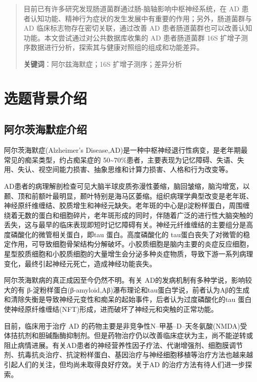 \documentclass[supercite]{HustGraduPaper}
\begin{document}
\clearpage%

\begin{abstract}
	目前已有许多研究发现肠道菌群通过肠-脑轴影响中枢神经系统，在 AD 患者认知功能、精神行为症状的发生发展中有重要的作用；另外，肠道菌群与 AD 临床标志物存在密切关联，通过改善 AD 患者肠道菌群也可以改善认知功能。本文尝试通过对公共数据库收集的 AD 患者肠道菌群 16S 扩增子测序数据进行分析，探索其与健康对照组的组成和功能差异。
	
	{\songti \bfseries 关键词}：阿尔兹海默症；16S 扩增子测序；差异分析
\end{abstract}
\section{选题背景介绍}


\subsection{阿尔茨海默症介绍}

阿尔茨海默症(Alzheimer's Disease,AD)是一种中枢神经退行性病变，是老年期最常见的痴呆类型，约占痴呆症的
50\textasciitilde70\%患者，主要表现为记忆障碍、失语、失用、失认、视空间能力损害、抽象思维和计算力损害、人格和行为改变等\cite{Burnsb158}。

AD患者的病理解剖检查可见大脑半球皮质弥漫性萎缩，脑回皱缩，脑沟增宽，以颞、顶和前额叶最明显，颞叶特别是海马区萎缩\cite{wenk2003neuropathologic}。组织病理学典型改变是老年斑、神经原纤维缠结、胶质增生和神经元缺失\cite{tiraboschi2004importance}。老年斑的中心是β淀粉样蛋白，周围缠绕着无数的蛋白和细胞碎片，老年斑形成的同时，伴随着广泛的进行性大脑突触的丢失，这与最早的临床表现即短时记忆障碍有关。神经元纤维缠结的主要组分是高度磷酸化的微管相关蛋白，即tau 蛋白。高度磷酸化的 tau蛋白丧失了对微管的稳定作用，可导致细胞骨架结构分解破坏。小胶质细胞是脑内主要的炎症反应细胞，星型胶质细胞和小胶质细胞的大量增生会分泌多种炎症物质，导致下游一系列病理变化，最终引起神经元死亡，造成神经功能丧失。

阿尔茨海默病的真正成因至今仍然不明。有关 AD的发病机制有多种学说，影响较大的有 β-淀粉样蛋白(β-amyloid,Aβ)瀑布理论\cite{hardy1991amyloid}和tau蛋白学说\cite{goedert1991tau}，前者认为Aβ的生成和清除失衡是导致神经元变性和痴呆的起始事件，后者认为过度磷酸化的tau 蛋白使神经原纤维缠结(NFT)形成，进而破坏了神经元和突触的正常功能。

目前，临床用于治疗 AD 的药物主要是非竞争性N--甲基--D--天冬氨酸(NMDA)受体拮抗剂和胆碱酯酶抑制剂。但是药物治疗仍以改善临床症状为主，尚不能逆转或阻止病情进展\cite{wall2014bacterial}。有关AD患者的神经营养性因子疗法、代谢增强剂、细胞膜调节剂、抗毒抗炎治疗、抗淀粉样蛋白、基因治疗与神经细胞移植等治疗方法也越来越引起人们的关注，但均尚未取得良好疗效\cite{hsu2017primary}。关于AD 的治疗方法有待人们进一步探索。
\end{document}
